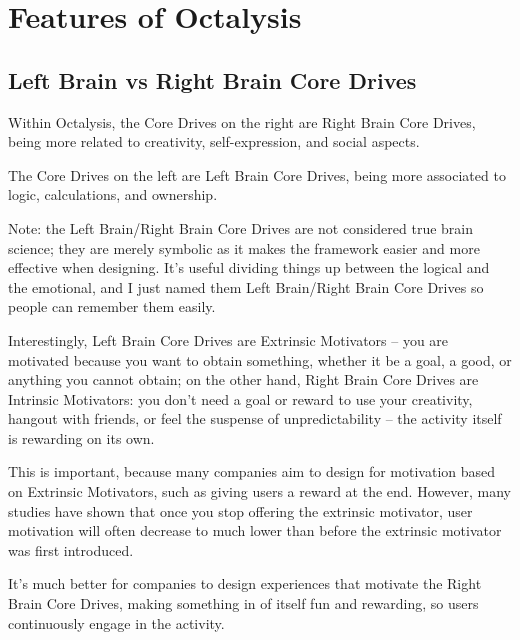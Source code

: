 \documentclass[
]{book}
\begin{document}
\hypertarget{features-of-octalysis}{%
\section{Features of Octalysis}\label{features-of-octalysis}}

\hypertarget{left-brain-vs-right-brain-core-drives}{%
\subsection{Left Brain vs Right Brain Core Drives}\label{left-brain-vs-right-brain-core-drives}}

Within Octalysis, the Core Drives on the right are Right Brain Core Drives, being more related to creativity, self-expression, and social aspects.

The Core Drives on the left are Left Brain Core Drives, being more associated to logic, calculations, and ownership.

Note: the Left Brain/Right Brain Core Drives are not considered true brain science; they are merely symbolic as it makes the framework easier and more effective when designing. It's useful dividing things up between the logical and the emotional, and I just named them Left Brain/Right Brain Core Drives so people can remember them easily.

Interestingly, Left Brain Core Drives are Extrinsic Motivators -- you are motivated because you want to obtain something, whether it be a goal, a good, or anything you cannot obtain; on the other hand, Right Brain Core Drives are Intrinsic Motivators: you don't need a goal or reward to use your creativity, hangout with friends, or feel the suspense of unpredictability -- the activity itself is rewarding on its own.

This is important, because many companies aim to design for motivation based on Extrinsic Motivators, such as giving users a reward at the end. However, many studies have shown that once you stop offering the extrinsic motivator, user motivation will often decrease to much lower than before the extrinsic motivator was first introduced.

It's much better for companies to design experiences that motivate the Right Brain Core Drives, making something in of itself fun and rewarding, so users continuously engage in the activity.
\end{document}
